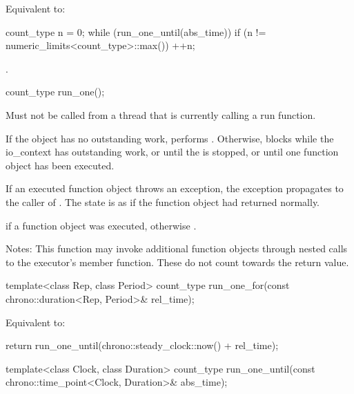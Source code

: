 \begin{itemdescr}
\pnum
\effects Equivalent to: 
\begin{codeblock}
count_type n = 0;
while (run_one_until(abs_time))
  if (n != numeric_limits<count_type>::max())
    ++n;
\end{codeblock}


\pnum
\returns {}.
\end{itemdescr}

\begin{itemdecl}
count_type run_one();
\end{itemdecl}

\begin{itemdescr}
\pnum
\requires Must not be called from a thread that is currently calling a run function.

\pnum
\effects If the  object has no outstanding work, performs . Otherwise, blocks while the io_context has outstanding work, or until the  is stopped, or until one function object has been executed.

\pnum
If an executed function object throws an exception, the exception propagates to the caller of . The  state is as if the function object had returned normally.

\pnum
\returns {} if a function object was executed, otherwise .

\pnum
Notes: This function may invoke additional function objects through nested calls to the  executor's  member function. These do not count towards the return value.
\end{itemdescr}

\begin{itemdecl}
template<class Rep, class Period>
  count_type run_one_for(const chrono::duration<Rep, Period>& rel_time);
\end{itemdecl}

\begin{itemdescr}
\pnum
\effects Equivalent to: 
\begin{codeblock}
return run_one_until(chrono::steady_clock::now() + rel_time);
\end{codeblock}

\end{itemdescr}

\begin{itemdecl}
template<class Clock, class Duration>
  count_type run_one_until(const chrono::time_point<Clock, Duration>& abs_time);
\end{itemdecl}

